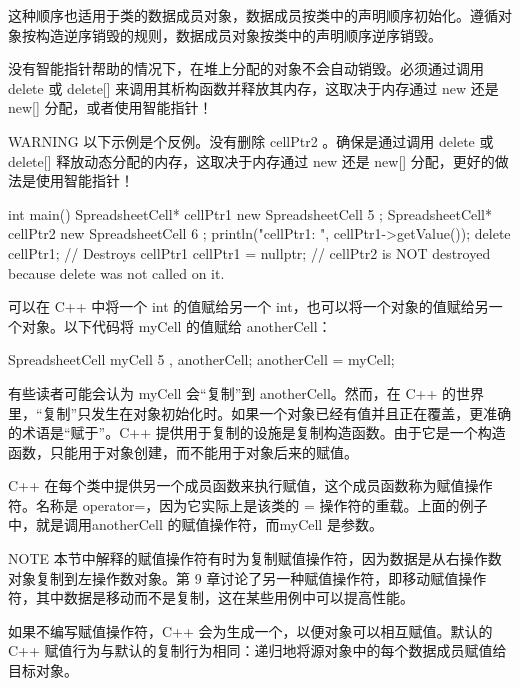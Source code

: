 这种顺序也适用于类的数据成员对象，数据成员按类中的声明顺序初始化。遵循对象按构造逆序销毁的规则，数据成员对象按类中的声明顺序逆序销毁。

没有智能指针帮助的情况下，在堆上分配的对象不会自动销毁。必须通过调用 delete 或 delete[] 来调用其析构函数并释放其内存，这取决于内存通过 new 还是 new[] 分配，或者使用智能指针！

\begin{myWarning}{WARNING}
以下示例是个反例。没有删除 cellPtr2 。确保是通过调用 delete 或 delete[] 释放动态分配的内存，这取决于内存通过 new 还是 new[] 分配，更好的做法是使用智能指针！
\end{myWarning}

\begin{cpp}
int main()
{
    SpreadsheetCell* cellPtr1 { new SpreadsheetCell { 5 } };
    SpreadsheetCell* cellPtr2 { new SpreadsheetCell { 6 } };
    println("cellPtr1: {}", cellPtr1->getValue());
    delete cellPtr1; // Destroys cellPtr1
    cellPtr1 = nullptr;
} // cellPtr2 is NOT destroyed because delete was not called on it.
\end{cpp}


可以在 C++ 中将一个 int 的值赋给另一个 int，也可以将一个对象的值赋给另一个对象。以下代码将 myCell 的值赋给 anotherCell：

\begin{cpp}
SpreadsheetCell myCell { 5 }, anotherCell;
anotherCell = myCell;
\end{cpp}

有些读者可能会认为 myCell 会“复制”到 anotherCell。然而，在 C++ 的世界里，“复制”只发生在对象初始化时。如果一个对象已经有值并且正在覆盖，更准确的术语是“赋于”。C++ 提供用于复制的设施是复制构造函数。由于它是一个构造函数，只能用于对象创建，而不能用于对象后来的赋值。

C++ 在每个类中提供另一个成员函数来执行赋值，这个成员函数称为赋值操作符。名称是 operator=，因为它实际上是该类的 = 操作符的重载。上面的例子中，就是调用anotherCell 的赋值操作符，而myCell 是参数。

\begin{myNotic}{NOTE}
本节中解释的赋值操作符有时为复制赋值操作符，因为数据是从右操作数对象复制到左操作数对象。第 9 章讨论了另一种赋值操作符，即移动赋值操作符，其中数据是移动而不是复制，这在某些用例中可以提高性能。
\end{myNotic}

如果不编写赋值操作符，C++ 会为生成一个，以便对象可以相互赋值。默认的 C++ 赋值行为与默认的复制行为相同：递归地将源对象中的每个数据成员赋值给目标对象。

